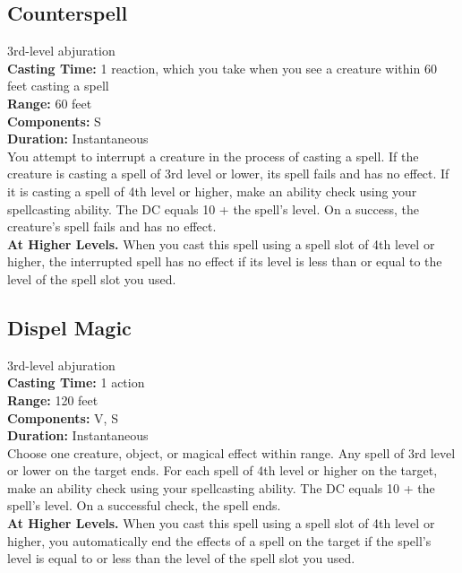 \documentclass[11pt, A4paper, english]{article}
\begin{document}
		\subsection{Counterspell}
3rd-level abjuration \\
\textbf{Casting Time:} 1 reaction, which you take when you see a creature within 60 feet casting a spell \\
\textbf{Range:} 60 feet \\
\textbf{Components:} S \\
\textbf{Duration:} Instantaneous \\
You attempt to interrupt a creature in the process of casting a spell. If the creature is casting a spell of 3rd level or lower, its spell fails and has no effect. If it is casting a spell of 4th level or higher, make an ability check using your spellcasting ability. The DC equals 10 + the spell’s level. On a success, the creature’s spell fails and has no effect. \\
\textbf{At Higher Levels.} When you cast this spell using a spell slot of 4th level or higher, the interrupted spell has no effect if its level is less than or equal to the level of the spell slot you used.

		\subsection{Dispel Magic}
3rd-level abjuration \\
\textbf{Casting Time:} 1 action \\
\textbf{Range:} 120 feet \\
\textbf{Components:} V, S \\
\textbf{Duration:} Instantaneous \\
Choose one creature, object, or magical effect within range. Any spell of 3rd level or lower on the target ends. For each spell of 4th level or higher on the target, make an ability check using your spellcasting ability. The DC equals 10 + the spell’s level. On a successful check, the spell ends. \\
\textbf{At Higher Levels.} When you cast this spell using a spell slot of 4th level or higher, you automatically end the effects of a spell on the target if the spell’s level is equal to or less than the level of the spell slot you used.
\end{document}
